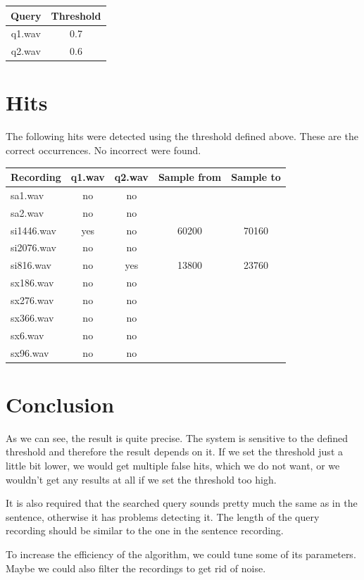 \documentclass[11pt]{article}
\begin{document}
\begin{center}
\begin{tabular}{ |c|c| } 
 \hline
 Query & Threshold \\ 
 \hline
 q1.wav &  0.7 \\ 
 q2.wav & 0.6 \\ 
 \hline
\end{tabular}
\end{center}

\section{Hits}
\par
The following hits were detected using the threshold defined above. These are the correct occurrences. No incorrect were found.

\begin{center}
\begin{tabular}{ |l|c|c|c|c| }
\hline
Recording & q1.wav & q2.wav & Sample from & Sample to  \\
\hline
sa1.wav & no & no & & \\ 
sa2.wav & no & no & & \\ 
si1446.wav & yes & no & 60200 & 70160 \\ 
si2076.wav & no & no & & \\ 
si816.wav & no & yes & 13800 & 23760\\ 
sx186.wav & no & no & & \\ 
sx276.wav & no & no & &\\
sx366.wav & no & no & & \\
sx6.wav & no & no & & \\
sx96.wav & no & no & & \\
\hline
\end{tabular}
\end{center}

\section{Conclusion}
\par
As we can see, the result is quite precise. The system is sensitive to the defined threshold and therefore the result depends on it. If we set the threshold just a little bit lower, we would get multiple false hits, which we do not want, or we wouldn't get any results at all if we set the threshold too high. 
\par
It is also required that the searched query sounds pretty much the same as in the sentence, otherwise it has problems detecting it. The length of the query recording should be similar to the one in the sentence recording.
\par
To increase the efficiency of the algorithm, we could tune some of its parameters.
Maybe we could also filter the recordings to get rid of noise.
\end{document}
